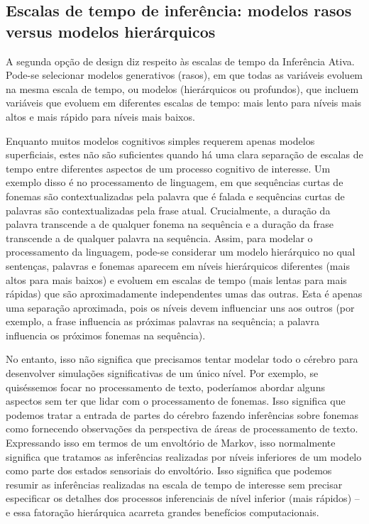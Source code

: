 \documentclass[
  12pt,
]{book}
\begin{document}
\hypertarget{escalas-de-tempo-de-inferuxeancia-modelos-rasos-versus-modelos-hieruxe1rquicos}{%
\subsection{Escalas de tempo de inferência: modelos rasos versus modelos hierárquicos}\label{escalas-de-tempo-de-inferuxeancia-modelos-rasos-versus-modelos-hieruxe1rquicos}}

A segunda opção de design diz respeito às escalas de tempo da Inferência Ativa. Pode-se selecionar modelos generativos (rasos), em que todas as variáveis evoluem na mesma escala de tempo, ou modelos (hierárquicos ou profundos), que incluem variáveis que evoluem em diferentes escalas de tempo: mais lento para níveis mais altos e mais rápido para níveis mais baixos.

Enquanto muitos modelos cognitivos simples requerem apenas modelos superficiais, estes não são suficientes quando há uma clara separação de escalas de tempo entre diferentes aspectos de um processo cognitivo de interesse. Um exemplo disso é no processamento de linguagem, em que sequências curtas de fonemas são contextualizadas pela palavra que é falada e sequências curtas de palavras são contextualizadas pela frase atual. Crucialmente, a duração da palavra transcende a de qualquer fonema na sequência e a duração da frase transcende a de qualquer palavra na sequência. Assim, para modelar o processamento da linguagem, pode-se considerar um modelo hierárquico no qual sentenças, palavras e fonemas aparecem em níveis hierárquicos diferentes (mais altos para mais baixos) e evoluem em escalas de tempo (mais lentas para mais rápidas) que são aproximadamente independentes umas das outras. Esta é apenas uma separação aproximada, pois os níveis devem influenciar uns aos outros (por exemplo, a frase influencia as próximas palavras na sequência; a palavra influencia os próximos fonemas na sequência).

No entanto, isso não significa que precisamos tentar modelar todo o cérebro para desenvolver simulações significativas de um único nível. Por exemplo, se quiséssemos focar no processamento de texto, poderíamos abordar alguns aspectos sem ter que lidar com o processamento de fonemas. Isso significa que podemos tratar a entrada de partes do cérebro fazendo inferências sobre fonemas como fornecendo observações da perspectiva de áreas de processamento de texto. Expressando isso em termos de um envoltório de Markov, isso normalmente significa que tratamos as inferências realizadas por níveis inferiores de um modelo como parte dos estados sensoriais do envoltório. Isso significa que podemos resumir as inferências realizadas na escala de tempo de interesse sem precisar especificar os detalhes dos processos inferenciais de nível inferior (mais rápidos) -- e essa fatoração hierárquica acarreta grandes benefícios computacionais.
\end{document}

